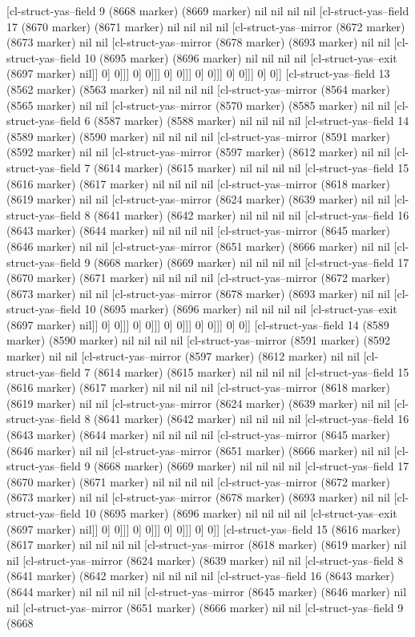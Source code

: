 {{[cl-struct-yas--field 9 (8668 marker) (8669 marker) nil nil nil nil [cl-struct-yas--field 17 (8670 marker) (8671 marker) nil nil nil nil [cl-struct-yas--mirror (8672 marker) (8673 marker) nil nil [cl-struct-yas--mirror (8678 marker) (8693 marker) nil nil [cl-struct-yas--field 10 (8695 marker) (8696 marker) nil nil nil nil [cl-struct-yas--exit (8697 marker) nil]] 0] 0]]] 0] 0]]] 0] 0]]] 0] 0]]] 0] 0]]] 0] 0]] [cl-struct-yas--field 13 (8562 marker) (8563 marker) nil nil nil nil [cl-struct-yas--mirror (8564 marker) (8565 marker) nil nil [cl-struct-yas--mirror (8570 marker) (8585 marker) nil nil [cl-struct-yas--field 6 (8587 marker) (8588 marker) nil nil nil nil [cl-struct-yas--field 14 (8589 marker) (8590 marker) nil nil nil nil [cl-struct-yas--mirror (8591 marker) (8592 marker) nil nil [cl-struct-yas--mirror (8597 marker) (8612 marker) nil nil [cl-struct-yas--field 7 (8614 marker) (8615 marker) nil nil nil nil [cl-struct-yas--field 15 (8616 marker) (8617 marker) nil nil nil nil [cl-struct-yas--mirror (8618 marker) (8619 marker) nil nil [cl-struct-yas--mirror (8624 marker) (8639 marker) nil nil [cl-struct-yas--field 8 (8641 marker) (8642 marker) nil nil nil nil [cl-struct-yas--field 16 (8643 marker) (8644 marker) nil nil nil nil [cl-struct-yas--mirror (8645 marker) (8646 marker) nil nil [cl-struct-yas--mirror (8651 marker) (8666 marker) nil nil [cl-struct-yas--field 9 (8668 marker) (8669 marker) nil nil nil nil [cl-struct-yas--field 17 (8670 marker) (8671 marker) nil nil nil nil [cl-struct-yas--mirror (8672 marker) (8673 marker) nil nil [cl-struct-yas--mirror (8678 marker) (8693 marker) nil nil [cl-struct-yas--field 10 (8695 marker) (8696 marker) nil nil nil nil [cl-struct-yas--exit (8697 marker) nil]] 0] 0]]] 0] 0]]] 0] 0]]] 0] 0]]] 0] 0]] [cl-struct-yas--field 14 (8589 marker) (8590 marker) nil nil nil nil [cl-struct-yas--mirror (8591 marker) (8592 marker) nil nil [cl-struct-yas--mirror (8597 marker) (8612 marker) nil nil [cl-struct-yas--field 7 (8614 marker) (8615 marker) nil nil nil nil [cl-struct-yas--field 15 (8616 marker) (8617 marker) nil nil nil nil [cl-struct-yas--mirror (8618 marker) (8619 marker) nil nil [cl-struct-yas--mirror (8624 marker) (8639 marker) nil nil [cl-struct-yas--field 8 (8641 marker) (8642 marker) nil nil nil nil [cl-struct-yas--field 16 (8643 marker) (8644 marker) nil nil nil nil [cl-struct-yas--mirror (8645 marker) (8646 marker) nil nil [cl-struct-yas--mirror (8651 marker) (8666 marker) nil nil [cl-struct-yas--field 9 (8668 marker) (8669 marker) nil nil nil nil [cl-struct-yas--field 17 (8670 marker) (8671 marker) nil nil nil nil [cl-struct-yas--mirror (8672 marker) (8673 marker) nil nil [cl-struct-yas--mirror (8678 marker) (8693 marker) nil nil [cl-struct-yas--field 10 (8695 marker) (8696 marker) nil nil nil nil [cl-struct-yas--exit (8697 marker) nil]] 0] 0]]] 0] 0]]] 0] 0]]] 0] 0]] [cl-struct-yas--field 15 (8616 marker) (8617 marker) nil nil nil nil [cl-struct-yas--mirror (8618 marker) (8619 marker) nil nil [cl-struct-yas--mirror (8624 marker) (8639 marker) nil nil [cl-struct-yas--field 8 (8641 marker) (8642 marker) nil nil nil nil [cl-struct-yas--field 16 (8643 marker) (8644 marker) nil nil nil nil [cl-struct-yas--mirror (8645 marker) (8646 marker) nil nil [cl-struct-yas--mirror (8651 marker) (8666 marker) nil nil [cl-struct-yas--field 9 (8668 }}
